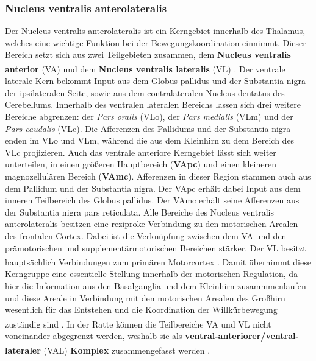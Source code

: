 \documentclass[12pt,a4paper,pdftex]{article}
\begin{document}
\subsubsection{Nucleus ventralis anterolateralis}  \label{subsubsec:ncl_anterolateralis}
Der Nucleus ventralis anterolateralis ist ein Kerngebiet innerhalb des Thalamus, welches eine wichtige Funktion bei der Bewegungskoordination einnimmt. Dieser Bereich setzt sich aus zwei Teilgebieten zusammen, dem \textbf{Nucleus ventralis anterior} (VA) und dem \textbf{Nucleus ventralis lateralis} (VL) \textsuperscript{\cite[8]{trepel2011neuroanatomie}}. Der ventrale laterale Kern bekommt Input aus dem  Globus pallidus und der Substantia nigra der ipsilateralen Seite, sowie aus dem contralateralen Nucleus dentatus des Cerebellums. Innerhalb des ventralen lateralen Bereichs lassen sich drei weitere Bereiche abgrenzen: der \textit{Pars oralis} (VLo), der \textit{Pars medialis} (VLm) und der \textit{Pars caudalis} (VLc). Die Afferenzen des Pallidums und der Substantia nigra enden im VLo und VLm, während die aus dem Kleinhirn zu dem Bereich des VLc projizieren. Auch das ventrale anteriore Kerngebiet lässt sich weiter unterteilen, in einen größeren Hauptbereich (\textbf{VApc}) und einen kleineren magnozellulären Bereich (\textbf{VAmc}). Afferenzen in dieser Region stammen auch aus dem Pallidum und der Substantia nigra. Der VApc erhält dabei Input aus dem inneren Teilbereich des Globus pallidus. Der VAmc erhält seine Afferenzen aus der Substantia nigra pars reticulata. Alle Bereiche des Nucleus ventralis anterolateralis besitzen eine reziproke Verbindung zu den motorischen Arealen des frontalen Cortex. Dabei ist die Verknüpfung zwischen dem VA und den prämotorischen und supplementärmotorischen Bereichen stärker. Der VL besitzt hauptsächlich Verbindungen zum primären Motorcortex \textsuperscript{\cite[12]{crossman2014neuroanatomy}}. Damit übernimmt diese Kerngruppe eine essentielle Stellung innerhalb der motorischen Regulation, da hier die Information aus den Basalganglia und dem Kleinhirn zusammmenlaufen und diese Areale in Verbindung mit den motorischen Arealen des Großhirn wesentlich für das Entstehen und die Koordination der Willkürbewegung zuständig sind \textsuperscript{\cite[8]{trepel2011neuroanatomie}}. In der Ratte können die Teilbereiche VA und VL nicht voneinander abgegrenzt werden, weshalb sie als \textbf{ventral-anteriorer/ventral-lateraler} (VAL) \textbf{Komplex} zusammengefasst werden \textsuperscript{\cite[16]{paxinos2014rat}}.     
\end{document}
